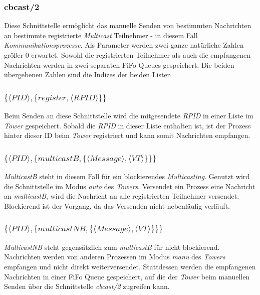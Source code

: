\subsubsection{cbcast/2}

Diese Schnittstelle ermöglicht das manuelle Senden von bestimmten Nachrichten an bestimmte registrierte \textit{Multicast} Teilnehmer - in diesem Fall \textit{Kommunikationsprozesse}. Als Parameter werden zwei ganze natürliche Zahlen größer 0 erwartet. Sowohl die registrierten Teilnehmer als auch die empfangenen Nachrichten werden in zwei separaten FiFo Queues gespeichert. Die beiden übergebenen Zahlen sind die Indizes der beiden Listen. 

\subsubsection{$\{\langle PID \rangle,\{register,\langle RPID\rangle\}\}$}

Beim Senden an diese Schnittstelle wird die mitgesendete \textit{RPID} in einer Liste im \textit{Tower} gespeichert. Sobald die \textit{RPID} in dieser Liste enthalten ist, ist der Prozess hinter dieser ID beim \textit{Tower} registriert und kann  somit Nachrichten empfangen.

\subsubsection{$\{\langle PID\rangle,\{multicastB,\{\langle Message\rangle,\langle VT\rangle\}\}\}$}

\textit{MulticastB} steht in diesem Fall für ein blockierendes \textit{Multicasting}. Genutzt wird die Schnittstelle im Modus \textit{auto} des \textit{Towers}. Versendet ein Prozess eine Nachricht an \textit{multicastB}, wird die Nachricht an alle registrierten Teilnehmer versendet. Blockierend ist der Vorgang, da das Versenden nicht nebenläufig verläuft.

\subsubsection{$\{\langle PID\rangle,\{multicastNB,\{\langle Message\rangle,\langle VT\rangle\}\}\}$}

\textit{MulticastNB} steht gegensätzlich zum \textit{multicastB} für nicht blockierend. Nachrichten werden von anderen Prozessen im Modus \textit{manu} des \textit{Towers} empfangen und nicht direkt weiterversendet. Stattdessen werden die empfangenen Nachrichten in einer FiFo Queue gespeichert, auf die der \textit{Tower} beim manuellen Senden über die Schnittstelle \textit{cbcast/2} zugreifen kann.

